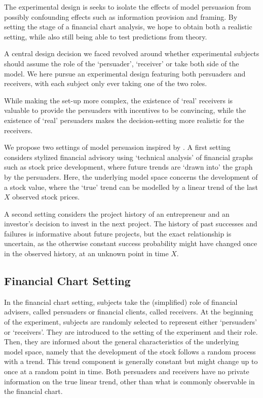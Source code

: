 \documentclass[11pt, a4paper, leqno]{article}
\begin{document}
The experimental design is seeks to isolate the effects of model persuasion from possibly confounding effects such as information provision and framing. By setting the stage of a financial chart analysis, we hope to obtain both a realistic setting, while also still being able to test predictions from theory.



A central design decision we faced revolved around whether experimental subjects should assume the role of the `persuader', `receiver' or take both side of the model. We here pursue an experimental design featuring both persuaders and receivers, with each subject only ever taking one of the two roles.

While making the set-up more complex, the existence of `real' receivers is valuable to provide the persuaders with incentives to be convincing, while the existence of `real' persuaders makes the decision-setting more realistic for the receivers. 

We propose two settings of model persuasion inspired by \citet{Schwartzstein}. A first setting considers stylized financial advisory using `technical analysis' of financial graphs such as stock price development, where future trends are `drawn into' the graph by the persuaders. Here, the underlying model space concerns the development of a stock value, where the `true' trend can be modelled by a linear trend of the last $X$ observed stock prices. 

A second setting considers the project history of an entrepreneur and an investor's decision to invest in the next project. The history of past successes and failures is informative about future projects, but the exact relationship is uncertain, as the otherwise constant success probability might have changed once in the observed history, at an unknown point in time $X$. 
\subsection{Financial Chart Setting}

In the financial chart setting, subjects take the (simplified) role of financial advisers, called persuaders or financial clients, called receivers. At the beginning of the experiment, subjects are randomly selected to represent either `persuaders' or `receivers'. They are introduced to the setting of the experiment and their role. Then, they are  informed about the general characteristics of the underlying model space, namely that the development of the stock follows a random process with a trend. This trend component is generally constant but might change up to once at a random point in time. Both persuaders and receivers have no private information on the true linear trend, other than what is commonly observable in the financial chart. 
\end{document}
